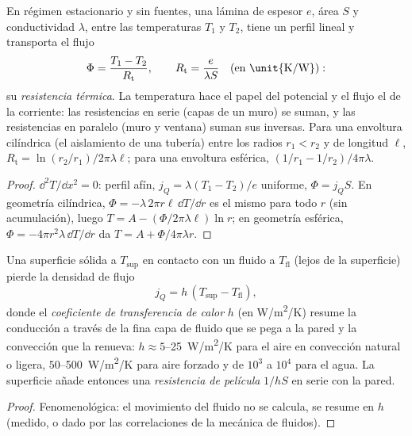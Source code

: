 \begin{proposition}\label{prop:b2:heat-conduction:resistance}
En régimen estacionario y sin fuentes, una lámina de espesor $e$,
área $S$ y conductividad $\lambda$, entre las temperaturas $T_1$ y
$T_2$, tiene un perfil lineal y transporta el flujo
\[
\Phi = \frac{T_1 - T_2}{R_{\text{t}}}, \qquad
R_{\text{t}} = \frac{e}{\lambda S}\quad\text{(en \unit{K/W})} :
\]
su \emph{resistencia térmica}. La temperatura
hace el papel del potencial y el flujo el de la corriente: las resistencias en
serie (capas de un muro) se suman, y las resistencias en paralelo (muro y
ventana) suman sus inversas. Para una envoltura cilíndrica (el aislamiento de una
tubería) entre los radios $r_1 < r_2$ y de longitud $\ell$,
$R_{\text{t}} = \ln(r_2/r_1)/2\pi\lambda\ell$; para una envoltura esférica,
$(1/r_1 - 1/r_2)/4\pi\lambda$.
\end{proposition}

\begin{proof}
$\dd^2T/\dd x^2 = 0$: perfil afín, $j_Q = \lambda(T_1 - T_2)/e$
uniforme, $\Phi = j_QS$. En geometría cilíndrica, $\Phi = -\lambda\,2\pi
r\ell\,\dd T/\dd r$ es el mismo para todo $r$ (sin acumulación), luego
$T = A - (\Phi/2\pi\lambda\ell)\ln r$; en geometría esférica, $\Phi =
-4\pi r^2\lambda\,\dd T/\dd r$ da $T = A + \Phi/4\pi\lambda r$.
\end{proof}

\begin{proposition}\label{prop:b2:heat-conduction:newton}
Una superficie sólida a $T_{\text{sup}}$ en contacto con un fluido a $T_{\text{fl}}$
(lejos de la superficie) pierde la densidad de flujo
\[
j_Q = h\,(T_{\text{sup}} - T_{\text{fl}}) ,
\]
donde el \emph{coeficiente de transferencia de calor} $h$ (en \unit{W/m^2/K}) resume la conducción a través de
la fina capa de fluido que se pega a la pared y la convección que la
renueva: $h \approx 5$--\qty{25}{W/m^2/K} para el aire en convección natural o
ligera, $50$--\qty{500}{W/m^2/K} para aire forzado y de $10^3$ a $10^4$
para el agua. La superficie añade entonces una \emph{resistencia de película} $1/hS$ en
serie con la pared.
\end{proposition}

\begin{proof}
Fenomenológica: el movimiento del fluido no se calcula, se resume
en $h$ (medido, o dado por las correlaciones de la mecánica de fluidos).
\end{proof}

